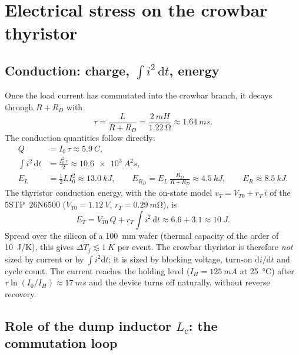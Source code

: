 \documentclass[11pt,a4paper]{article}
\begin{document}
\section{Electrical stress on the crowbar thyristor}

\subsection{Conduction: charge, $\int i^2\,\mathrm{d}t$, energy}

Once the load current has commutated into the crowbar branch, it decays through
$R + R_D$ with
\begin{equation}
  \tau = \frac{L}{R + R_D} = \frac{\SI{2}{mH}}{\SI{1.22}{\ohm}} \approx \SI{1.64}{ms}.
\end{equation}
The conduction quantities follow directly:
\begin{align}
  Q &= I_0\,\tau \approx \SI{5.9}{C}, \\
  \int i^2\,\mathrm{d}t &= \frac{I_0^2\,\tau}{2} \approx \SI{10.6e3}{A^2 s}, \\
  E_{L} &= \tfrac12 L I_0^2 \approx \SI{13.0}{kJ},
  \qquad E_{R_D} = E_L\,\frac{R_D}{R+R_D} \approx \SI{4.5}{kJ},
  \qquad E_{R} \approx \SI{8.5}{kJ}.
\end{align}
The thyristor conduction energy, with the on-state model $v_T = V_{T0} + r_T\,i$ of the
5STP~26N6500 ($V_{T0} = \SI{1.12}{V}$, $r_T = \SI{0.29}{m\ohm}$), is
\begin{equation}
  E_T = V_{T0}\,Q + r_T \int i^2\,\mathrm{d}t \approx 6.6 + 3.1 \approx \SI{10}{J}.
\end{equation}
Spread over the silicon of a \SI{100}{mm} wafer (thermal capacity of the order of
\SI{10}{J/K}), this gives $\Delta T_j \lesssim \SI{1}{K}$ per event. The crowbar
thyristor is therefore \emph{not} sized by current or by $\int i^2\mathrm{d}t$; it is sized by
blocking voltage, turn-on $\mathrm{d}i/\mathrm{d}t$ and cycle count. The current reaches the
holding level ($I_H = \SI{125}{mA}$ at \SI{25}{\celsius}) after $\tau\ln(I_0/I_H) \approx
\SI{17}{ms}$ and the device turns off naturally, without reverse recovery.

\subsection{Role of the dump inductor $L_c$: the commutation loop}
\label{sec:lc}
\end{document}
